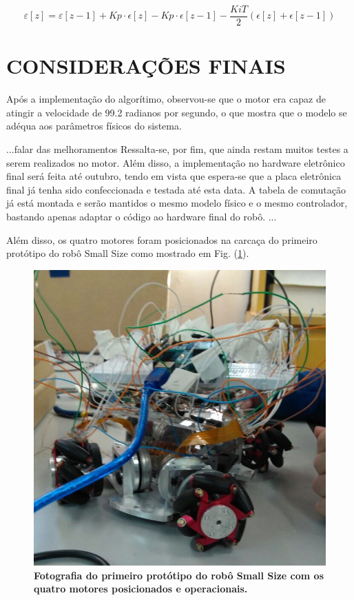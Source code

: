 \documentclass[10pt,fleqn,a4paper]{article}
\begin{document}
    \begin{equation}
    \varepsilon[z] = \varepsilon[z-1] + Kp\cdot\epsilon[z] - Kp\cdot\epsilon[z-1] - \frac{Ki T}{2}(\epsilon[z] + \epsilon[z-1]) \label{recorrencia}
    \end{equation}
    
    \section{CONSIDERAÇÕES FINAIS}
    
    Após a implementação do algorítimo, observou-se que o motor era capaz de atingir a velocidade de 99.2 radianos por segundo, o que mostra que o modelo se adéqua aos parâmetros físicos do sistema.
    
    ...falar das melhoramentos
    Ressalta-se, por fim, que ainda restam muitos testes a serem realizados no motor. Além disso, a implementação no hardware eletrônico final será feita até outubro, tendo em vista que espera-se que a placa eletrônica final já tenha sido confeccionada e testada até esta data.  A tabela de comutação já está montada e serão mantidos o mesmo modelo físico e o mesmo controlador, bastando apenas adaptar o código ao hardware final do robô.
    ...
    
    Além disso, os quatro motores foram posicionados na carcaça do primeiro protótipo do robô Small Size como mostrado em Fig. (\ref{fig:smallfoto}).

	\begin{figure}[ht]
		\begin{center}
			\includegraphics[angle=0, scale=0.3]{images/smallfoto}
		\end{center}
		\caption{\textbf{Fotografia do primeiro protótipo do robô Small Size com os quatro motores posicionados e operacionais.}}
		\label{fig:smallfoto}
	\end{figure}
\end{document}
